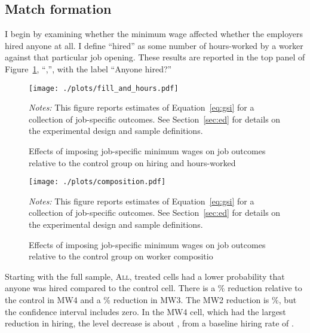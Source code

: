\documentclass[AER]{AEA}
\newcommand{\all}{\textsc{All}}
\begin{document}
\subsection{Match formation} \label{sec:ld}

I begin by examining whether the minimum wage affected whether the employers hired anyone at all.
I define ``hired'' as some number of hours-worked by a worker against that particular job opening.
These results are reported in the top panel of Figure~\ref{fig:all_new}, ``\panelA{},'', with the label ``Anyone hired?''

\begin{figure}[h!]
  \centering
  \caption{Effects of imposing job-specific minimum wages on job
    outcomes relative to the control group on hiring and hours-worked \label{fig:all_new}}
  \begin{minipage}{1.15\linewidth}
  \texttt{[image: ./plots/fill\_and\_hours.pdf]}
  \end{minipage}
  \begin{minipage}{0.95\linewidth}
    {\footnotesize
      \emph{Notes:} This figure reports estimates of Equation~\ref{eq:gsi} for a collection of job-specific outcomes.
      See Section~\ref{sec:ed} for details on the experimental design and sample definitions. 
    }
\end{minipage} 
\end{figure} 


\begin{figure}[h!]
  \centering
  \caption{Effects of imposing job-specific minimum wages on job
    outcomes relative to the control group on worker compositio \label{fig:all_new_part_2}}
  \begin{minipage}{1.15\linewidth}
  \texttt{[image: ./plots/composition.pdf]}
  \end{minipage}
  \begin{minipage}{0.95\linewidth}
    {\footnotesize
      \emph{Notes:} This figure reports estimates of Equation~\ref{eq:gsi} for a collection of job-specific outcomes.
      See Section~\ref{sec:ed} for details on the experimental design and sample definitions. 
    }
\end{minipage} 
\end{figure} 


\FloatBarrier 

Starting with the full sample, \all{}, treated cells had a lower probability that anyone was hired compared to the control cell.
There is a \ALLFourItotalchargegtZeropctchange{}\% reduction relative to the control in MW4 and a \ALLThreeItotalchargegtZeropctchange{}\% reduction in MW3.
The MW2 reduction is \ALLTwoItotalchargegtZeropctchange{}\%, but the confidence interval includes zero. 
In the MW4 cell, which had the largest reduction in hiring, the level decrease is about \ALLFourItotalchargegtZeroeffects{}, from a baseline hiring rate of \ALLZeroItotalchargegtZerocontrolvalue{}.
\end{document}
